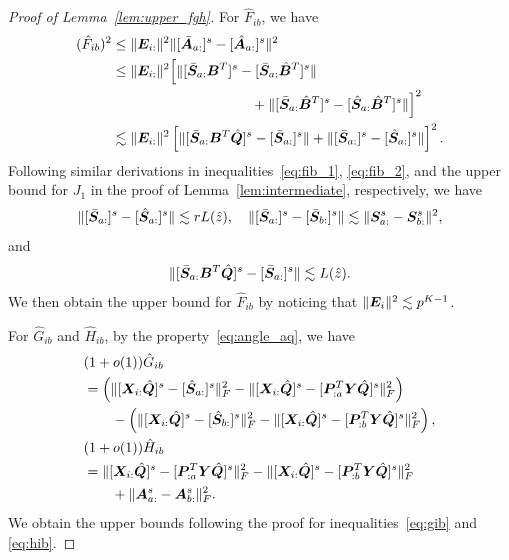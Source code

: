 \documentclass[journal]{IEEEtran}
\theoremstyle{definition}
\theoremstyle{definition}
\newcommand{\of}[1]{\left(#1\right)}
\newcommand{\off}[1]{\left[#1\right]}
\begin{document}
\begin{proof}[Proof of Lemma~\ref{lem:upper_fgh}]
{ For $\hat F_{ib}$, we have 
\begin{align}
    (\hat F_{ib})^2 &\leq \onormSize{}{\mE_{i:}}^2 \onormSize{}{ [\bar  \mA_{a:}]^s - [\hat \mA_{a:}]^s }^2\\
    &\leq \onormSize{}{\mE_{i:}}^2  \Big[ \onormSize{}{ [ \bar \mS_{a:} \mB^T]^s - [\bar \mS_{a:} \hat \mB^T]^s } \\
    & \quad \quad \quad \quad \quad  \quad  \quad \quad \quad \quad +  \onormSize{}{ [ \bar \mS_{a:} \hat \mB^T]^s -  [\hat \mS_{a:} \hat \mB^T]^s}  \Big]^2 \\
    &\lesssim \onormSize{}{\mE_{i:}}^2  \off{ \onormSize{}{ [ \bar \mS_{a:} \mB^T \hat \mQ]^s - [\bar \mS_{a:}]^s } +  \onormSize{}{ [ \bar \mS_{a:} ]^s -  [ \hat \mS_{a:} ]^s}  }^2.
\end{align}
Following similar derivations in inequalities~\eqref{eq:fib_1}, \eqref{eq:fib_2}, and the upper bound for $J_{1}$ in the proof of Lemma~\ref{lem:intermediate}, respectively, we have 
\begin{equation}
    \lVert [ \bar {\bm S}_{a:} ]^s -  [ \hat {\bm S}_{a:} ]^s\rVert  \lesssim r L(\hat z), \quad  \lVert [ \bar {\bm S}_{a:} ]^s -  [ \bar {\bm S}_{b:} ]^s\rVert \lesssim \lVert\bm S_{a:}^s - \bm S_{b:}^s\rVert^2, 
\end{equation}
and 
\begin{align}
    \lVert [ \bar {\bm S}_{a:} \bm B^T \hat {\bm{Q}}]^s - [\bar {\bm S}_{a:}]^s \rVert \lesssim L(\hat z).
\end{align}
We then obtain the upper bound for $\hat F_{ib}$ by noticing that $\lVert\bm{E}_i\rVert^2 \lesssim p^{K-1}$.

For $\hat G_{ib}$ and $\hat H_{ib}$, by the property~\eqref{eq:angle_aq}, we have 
    \begin{align}
        &(1+o(1))\hat G_{ib}\\
        & = \of{ \onormSize{}{[\mX_{i:}\hat \mQ]^s - [\hat \mS_{a:}]^s}_F^2 - \onormSize{}{ [\mX_{i:} \hat \mQ]^s - [\mP_{:a}^T \mY \hat \mQ ]^s }_F^2  } \\
        & \quad \quad- \of{ \onormSize{}{[\mX_{i:} \hat \mQ]^s - [\hat \mS_{b:}]^s}_F^2 - \onormSize{}{ [\mX_{i:} \hat \mQ]^s - [\mP_{:b}^T \mY \hat \mQ ]^s }_F^2   }, \\
        &(1+o(1))\hat H_{ib}  \\
        & = \onormSize{}{ [\mX_{i:} \hat \mQ]^s - [\mP_{:a}^T \mY \hat \mQ ]^s }_F^2 - \onormSize{}{ [\mX_{i:} \hat \mQ]^s - [\mP_{:b}^T \mY \hat \mQ]^s }_F^2 \\
        & \quad \quad + \onormSize{}{ \mA^s_{a:} -  \mA^s_{b:}  }_F^2.
    \end{align}
    We obtain the upper bounds following the proof for inequalities~\eqref{eq:gib} and \eqref{eq:hib}.
}


\end{proof}
\end{document}
